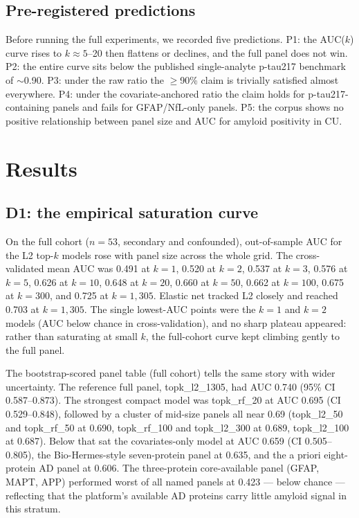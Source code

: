 \documentclass{article}
\begin{document}
\subsection{Pre-registered predictions}

Before running the full experiments, we recorded five predictions. P1: the
AUC($k$) curve rises to $k\approx5$--20 then flattens or declines, and the full
panel does not win. P2: the entire curve sits below the published
single-analyte p-tau217 benchmark of $\sim$0.90. P3: under the raw ratio the
$\geq$90\% claim is trivially satisfied almost everywhere. P4: under the
covariate-anchored ratio the claim holds for p-tau217-containing panels and
fails for GFAP/NfL-only panels. P5: the corpus shows no positive relationship
between panel size and AUC for amyloid positivity in CU.

\section{Results}

\subsection{D1: the empirical saturation curve}

On the full cohort ($n=53$, secondary and confounded), out-of-sample AUC for
the L2 top-$k$ models rose with panel size across the whole grid. The
cross-validated mean AUC was 0.491 at $k=1$, 0.520 at $k=2$, 0.537 at $k=3$,
0.576 at $k=5$, 0.626 at $k=10$, 0.648 at $k=20$, 0.660 at $k=50$, 0.662 at
$k=100$, 0.675 at $k=300$, and 0.725 at $k=1{,}305$. Elastic net tracked L2
closely and reached 0.703 at $k=1{,}305$. The single lowest-AUC points were the
$k=1$ and $k=2$ models (AUC below chance in cross-validation), and no sharp
plateau appeared: rather than saturating at small $k$, the full-cohort curve
kept climbing gently to the full panel.

The bootstrap-scored panel table (full cohort) tells the same story with wider
uncertainty. The reference full panel, topk\_l2\_1305, had AUC 0.740 (95\% CI
0.587--0.873). The strongest compact model was topk\_rf\_20 at AUC 0.695 (CI
0.529--0.848), followed by a cluster of mid-size panels all near 0.69
(topk\_l2\_50 and topk\_rf\_50 at 0.690, topk\_rf\_100 and topk\_l2\_300 at
0.689, topk\_l2\_100 at 0.687). Below that sat the covariates-only model at AUC
0.659 (CI 0.505--0.805), the Bio-Hermes-style seven-protein panel at 0.635, and
the a priori eight-protein AD panel at 0.606. The three-protein core-available
panel (GFAP, MAPT, APP) performed worst of all named panels at 0.423 --- below
chance --- reflecting that the platform's available AD proteins carry little
amyloid signal in this stratum.
\end{document}
